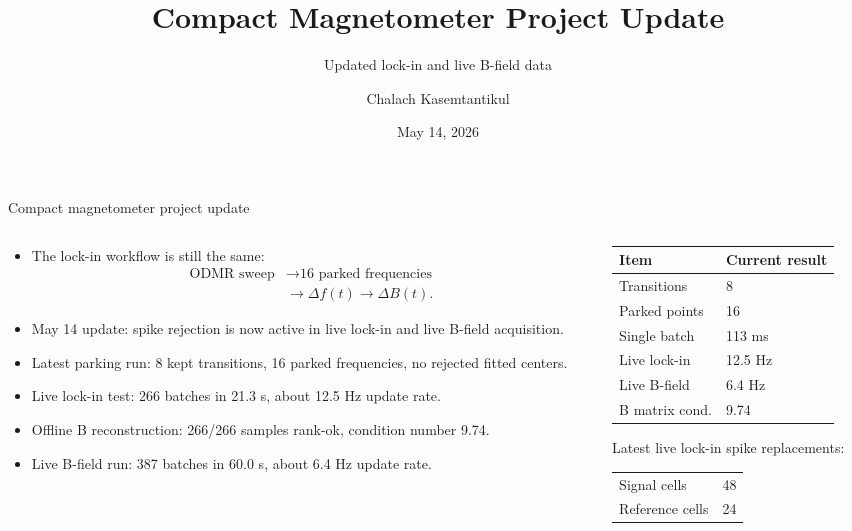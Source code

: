 \documentclass[aspectratio=169,10pt]{beamer}
\title{Compact Magnetometer Project Update}
\subtitle{Updated lock-in and live B-field data}
\author{Chalach Kasemtantikul}
\date{May 14, 2026}
\newcommand{\smallitemsep}{\setlength{\itemsep}{0.45em}}
\begin{document}
\begin{frame}{Compact magnetometer project update}
\begin{columns}[T,totalwidth=\textwidth]
\begin{column}{0.56\textwidth}
\begin{itemize}\smallitemsep
  \item The lock-in workflow is still the same:
  \[
  \begin{aligned}
  \text{ODMR sweep} &\rightarrow \text{16 parked frequencies} \\
  &\rightarrow \Delta f(t) \rightarrow \Delta B(t).
  \end{aligned}
  \]
  \item May 14 update: spike rejection is now active in live lock-in and live B-field acquisition.
  \item Latest parking run: 8 kept transitions, 16 parked frequencies, no rejected fitted centers.
  \item Live lock-in test: 266 batches in 21.3 s, about 12.5 Hz update rate.
  \item Offline B reconstruction: 266/266 samples rank-ok, condition number 9.74.
  \item Live B-field run: 387 batches in 60.0 s, about 6.4 Hz update rate.
\end{itemize}
\end{column}
\begin{column}{0.40\textwidth}
\centering
\begin{tabular}{@{}ll@{}}
\toprule
Item & Current result \\
\midrule
Transitions & 8 \\
Parked points & 16 \\
Single batch & 113 ms \\
Live lock-in & 12.5 Hz \\
Live B-field & 6.4 Hz \\
B matrix cond. & 9.74 \\
\bottomrule
\end{tabular}

\vspace{1.2em}
\footnotesize
Latest live lock-in spike replacements:

\vspace{0.2em}
\begin{tabular}{@{}lr@{}}
\toprule
Signal cells & 48 \\
Reference cells & 24 \\
\bottomrule
\end{tabular}
\end{column}
\end{columns}
\end{frame}
\end{document}
